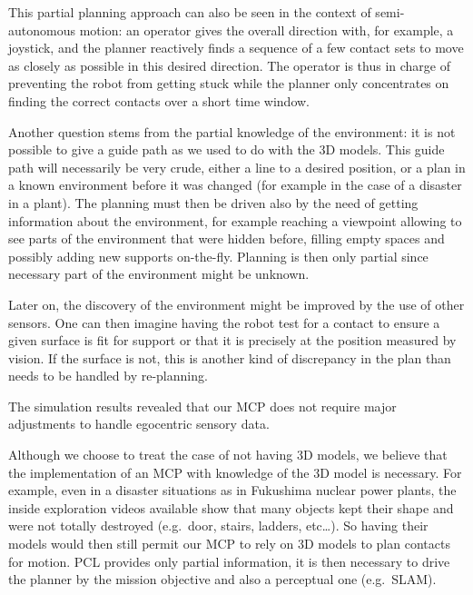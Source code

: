 This partial planning approach can also be seen in the context of semi-autonomous motion: an operator gives the overall direction with, for example, a joystick, and the planner reactively finds a sequence of a few contact sets to move as closely as possible in this desired direction.
The operator is thus in charge of preventing the robot from getting stuck while the planner only concentrates on finding the correct contacts over a short time window.

Another question stems from the partial knowledge of the environment: it is not possible to give a guide path as we used to do with the 3D models.
This guide path will necessarily be very crude, either a line to a desired position, or a plan in a known environment before it was changed (for example in the case of a disaster in a plant).
The planning must then be driven also by the need of getting information about the environment, for example reaching a viewpoint allowing to see parts of the environment that were hidden before, filling empty spaces and possibly adding new supports on-the-fly.
Planning is then only partial since necessary part of the environment might be unknown.

Later on, the discovery of the environment might be improved by the use of other sensors.
One can then imagine having the robot test for a contact to ensure a given surface is fit for support or that it is precisely at the position measured by vision.
If the surface is not, this is another kind of discrepancy in the plan than needs to be handled by re-planning.


The simulation results revealed that our MCP does not require major adjustments to handle egocentric sensory data.

Although we choose to treat the case of not having 3D models, we believe that the implementation of an MCP with knowledge of the 3D model is necessary.
For example, even in a disaster situations as in Fukushima nuclear power plants, the inside exploration videos available show that many objects kept their shape and were not totally destroyed (e.g.\ door, stairs, ladders, etc\ldots).
So having their models would then still permit our MCP to rely on 3D models to plan contacts for motion.
PCL provides only partial information, it is then necessary to drive the planner by the mission objective and also a perceptual one (e.g.\ SLAM).


